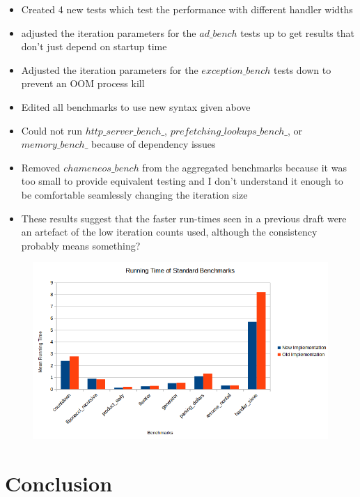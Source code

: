 \documentclass[logo,bsc,singlespacing,parskip,online]{infthesis}
\begin{document}
\begin{itemize}
 \item Created 4 new tests which test the performance with different handler widths
 \item adjusted the iteration parameters for the $ad\_bench$ tests up to get results that don't just depend on startup time
 \item Adjusted the iteration parameters for the $exception\_bench$ tests down to prevent an OOM process kill
 \item Edited all benchmarks to use new syntax given above
 \item Could not run $http\_server\_bench\_$, $prefetching\_lookups\_bench\_$, or $memory\_bench\_$ because of dependency issues
 \item Removed $chameneos\_bench$ from the aggregated benchmarks because it was too small to provide equivalent testing and I don't understand it enough to be comfortable seamlessly changing the iteration size
 \item These results suggest that the faster run-times seen in a previous draft were an artefact of the low iteration counts used, although the consistency probably means something?
 \end{itemize}
 

\begin{figure}[h]
    \centering
    \includegraphics[width=1\linewidth]{bench_tests.PNG}
    \label{fig:benches}
\end{figure}








\chapter{Conclusion}
\end{document}
